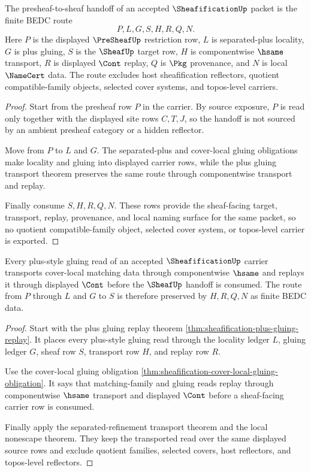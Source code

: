 \begin{theorem}
\label{thm:sheafification-presheaf-sheaf-route}
The presheaf-to-sheaf handoff of an accepted $\SheafificationUp$ packet is the finite BEDC route
$$
P,L,G,S,H,R,Q,N .
$$
Here $P$ is the displayed $\PreSheafUp$ restriction row, $L$ is separated-plus locality, $G$ is plus gluing, $S$ is the $\SheafUp$ target row, $H$ is componentwise $\hsame$ transport, $R$ is displayed $\Cont$ replay, $Q$ is $\Pkg$ provenance, and $N$ is local $\NameCert$ data. The route excludes host sheafification reflectors, quotient compatible-family objects, selected cover systems, and topos-level carriers.
\end{theorem}
\begin{proof}
Start from the presheaf row $P$ in the carrier. By source exposure, $P$ is read only together with the displayed site rows $C,T,J$, so the handoff is not sourced by an ambient presheaf category or a hidden reflector.

Move from $P$ to $L$ and $G$. The separated-plus and cover-local gluing obligations make locality and gluing into displayed carrier rows, while the plus gluing transport theorem preserves the same route through componentwise transport and replay.

Finally consume $S,H,R,Q,N$. These rows provide the sheaf-facing target, transport, replay, provenance, and local naming surface for the same packet, so no quotient compatible-family object, selected cover system, or topos-level carrier is exported.
\end{proof}

\begin{theorem}
\label{thm:sheafification-plus-gluing-transport}
Every plus-style gluing read of an accepted $\SheafificationUp$ carrier transports cover-local matching data through componentwise $\hsame$ and replays it through displayed $\Cont$ before the $\SheafUp$ handoff is consumed. The route from $P$ through $L$ and $G$ to $S$ is therefore preserved by $H,R,Q,N$ as finite BEDC data.
\end{theorem}
\begin{proof}
Start with the plus gluing replay theorem \autoref{thm:sheafification-plus-gluing-replay}. It places every plus-style gluing read through the locality ledger $L$, gluing ledger $G$, sheaf row $S$, transport row $H$, and replay row $R$.

Use the cover-local gluing obligation \autoref{thm:sheafification-cover-local-gluing-obligation}. It says that matching-family and gluing reads replay through componentwise $\hsame$ transport and displayed $\Cont$ before a sheaf-facing carrier row is consumed.

Finally apply the separated-refinement transport theorem and the local nonescape theorem. They keep the transported read over the same displayed source rows and exclude quotient families, selected covers, host reflectors, and topos-level reflectors.
\end{proof}

